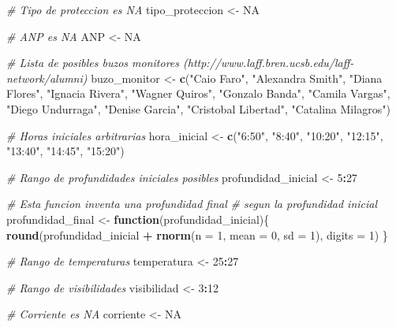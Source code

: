\documentclass[]{krantz}
\newenvironment{Shaded}{\begin{snugshade}}{\end{snugshade}}
\newcommand{\CommentTok}[1]{\textcolor[rgb]{0.56,0.35,0.01}{\textit{#1}}}
\newcommand{\ControlFlowTok}[1]{\textcolor[rgb]{0.13,0.29,0.53}{\textbf{#1}}}
\newcommand{\DataTypeTok}[1]{\textcolor[rgb]{0.13,0.29,0.53}{#1}}
\newcommand{\DecValTok}[1]{\textcolor[rgb]{0.00,0.00,0.81}{#1}}
\newcommand{\KeywordTok}[1]{\textcolor[rgb]{0.13,0.29,0.53}{\textbf{#1}}}
\newcommand{\NormalTok}[1]{#1}
\newcommand{\OperatorTok}[1]{\textcolor[rgb]{0.81,0.36,0.00}{\textbf{#1}}}
\newcommand{\OtherTok}[1]{\textcolor[rgb]{0.56,0.35,0.01}{#1}}
\newcommand{\StringTok}[1]{\textcolor[rgb]{0.31,0.60,0.02}{#1}}
\begin{document}
\begin{Shaded}
\begin{Highlighting}[]
{\CommentTok{# Tipo de proteccion es NA}
\NormalTok{tipo_proteccion <-}\StringTok{ }\OtherTok{NA}

\CommentTok{# ANP es NA}
\NormalTok{ANP <-}\StringTok{ }\OtherTok{NA}

\CommentTok{# Lista de posibles buzos monitores (http://www.laff.bren.ucsb.edu/laff-network/alumni)}
\NormalTok{buzo_monitor <-}\StringTok{ }\KeywordTok{c}\NormalTok{(}\StringTok{"Caio Faro"}\NormalTok{,}
                  \StringTok{"Alexandra Smith"}\NormalTok{,}
                  \StringTok{"Diana Flores"}\NormalTok{, }
                  \StringTok{"Ignacia Rivera"}\NormalTok{,}
                  \StringTok{"Wagner Quiros"}\NormalTok{,}
                  \StringTok{"Gonzalo Banda"}\NormalTok{,}
                  \StringTok{"Camila Vargas"}\NormalTok{,}
                  \StringTok{"Diego Undurraga"}\NormalTok{,}
                  \StringTok{"Denise Garcia"}\NormalTok{,}
                  \StringTok{"Cristobal Libertad"}\NormalTok{,}
                  \StringTok{"Catalina Milagros"}\NormalTok{)}

\CommentTok{# Horas iniciales arbitrarias}
\NormalTok{hora_inicial <-}\StringTok{ }\KeywordTok{c}\NormalTok{(}\StringTok{"6:50"}\NormalTok{, }\StringTok{"8:40"}\NormalTok{, }\StringTok{"10:20"}\NormalTok{, }\StringTok{"12:15"}\NormalTok{, }\StringTok{"13:40"}\NormalTok{, }\StringTok{"14:45"}\NormalTok{, }\StringTok{"15:20"}\NormalTok{)}

\CommentTok{# Rango de profundidades iniciales posibles}
\NormalTok{profundidad_inicial <-}\StringTok{ }\DecValTok{5}\OperatorTok{:}\DecValTok{27}

\CommentTok{# Esta funcion inventa una profundidad final}
\CommentTok{# segun la profundidad inicial}
\NormalTok{profundidad_final <-}\StringTok{ }\ControlFlowTok{function}\NormalTok{(profundidad_inicial)\{}
  \KeywordTok{round}\NormalTok{(profundidad_inicial }\OperatorTok{+}\StringTok{ }\KeywordTok{rnorm}\NormalTok{(}\DataTypeTok{n =} \DecValTok{1}\NormalTok{, }\DataTypeTok{mean =} \DecValTok{0}\NormalTok{, }\DataTypeTok{sd =} \DecValTok{1}\NormalTok{), }\DataTypeTok{digits =} \DecValTok{1}\NormalTok{)}
\NormalTok{\}}

\CommentTok{# Rango de temperaturas}
\NormalTok{temperatura <-}\StringTok{ }\DecValTok{25}\OperatorTok{:}\DecValTok{27}

\CommentTok{# Rango de visibilidades}
\NormalTok{visibilidad <-}\StringTok{ }\DecValTok{3}\OperatorTok{:}\DecValTok{12}

\CommentTok{# Corriente es NA}
\NormalTok{corriente <-}\StringTok{ }\OtherTok{NA}

}
\end{Highlighting}
\end{Shaded}
\end{document}

